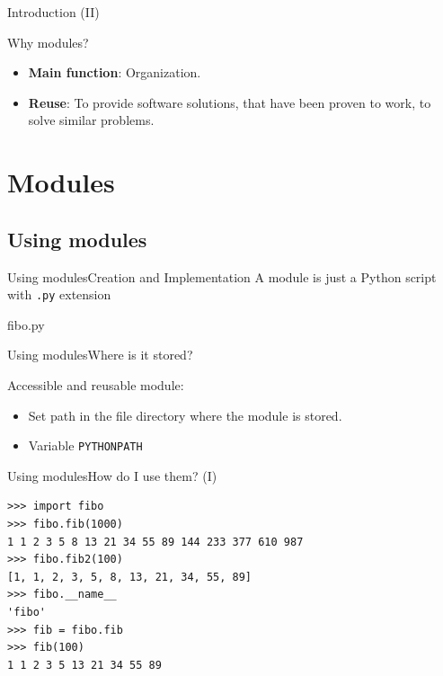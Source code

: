 \documentclass[10pt,compress]{beamer} %
\begin{document}
\begin{frame}{Introduction (II)}
		\begin{block}{Why modules?}
			\begin{itemize}
			\item \textbf{Main function}: Organization.
			\item \textbf{Reuse}: To provide software solutions, that have been proven to work, to solve similar problems.
			\end{itemize}
		\end{block}
		
\end{frame}

\section{Modules}

\subsection{Using modules}
\begin{frame}{Using modules}{Creation and Implementation}
	\vspace{-0.2cm}
	A module is just a Python script with \texttt{.py} extension
	\vspace{-0.2cm}
	\begin{exampleblock}{fibo.py}
	\vspace{-0.2cm}
	
	\vspace{-0.2cm}
	\end{exampleblock}
\end{frame}

\begin{frame}{Using modules}{Where is it stored?}

 Accessible and reusable module:
 \begin{itemize}
 \item  Set path in the file directory where the module is stored.
 \item Variable \texttt{PYTHONPATH}
 \end{itemize}
 \end{frame}
 
\begin{frame}[fragile]{Using modules}{How do I use them? (I)}
	\begin{block}{}
	\begin{verbatim}
>>> import fibo
>>> fibo.fib(1000)
1 1 2 3 5 8 13 21 34 55 89 144 233 377 610 987
>>> fibo.fib2(100)
[1, 1, 2, 3, 5, 8, 13, 21, 34, 55, 89]
>>> fibo.__name__
'fibo'
>>> fib = fibo.fib
>>> fib(100)
1 1 2 3 5 13 21 34 55 89
\end{verbatim}
	\vspace{-0.2cm}
	\end{block}
\end{frame}
\end{document}

